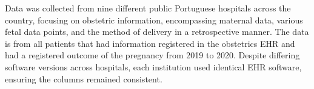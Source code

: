 Data was collected from nine different public Portuguese hospitals across the country, focusing on obstetric information, encompassing maternal data, various fetal data points, and the method of delivery in a retrospective manner. The data is from all patients that had information registered in the obstetrics EHR and had a registered outcome of the pregnancy from 2019 to 2020. Despite differing software versions across hospitals, each institution used identical EHR software, ensuring the columns remained consistent.
